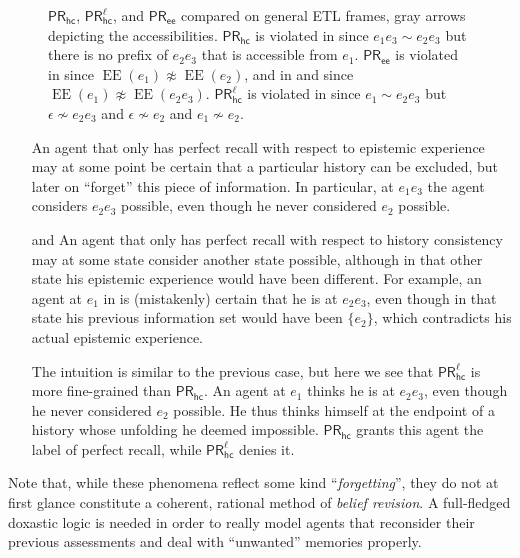\documentclass{article}
\newcommand{\PRhc}{\ensuremath{\mathsf{PR_{hc}}}\xspace}
\newcommand{\PRhcl}{\ensuremath{\mathsf{PR_{hc}^\ell}}\xspace}
\newcommand{\PRee}{\ensuremath{\mathsf{PR_{ee}}}\xspace}
\newcommand{\acc}{\sim}
\DeclareMathOperator{\EE}{EE}
\newcounter{#1}
\begin{document}
\begin{figure}
{
}
  \caption{\PRhc, \PRhcl, and \PRee compared on general ETL frames,
    gray arrows depicting the accessibilities.
    \PRhc is violated in 
    since $e_1e_3\acc e_2e_3$ but there is no prefix of $e_2e_3$ that is accessible from $e_1$.
    \PRee is violated in 
    since $\EE(e_1)\not\approx\EE(e_2)$,
    and in  and 
    since $\EE(e_1)\not\approx\EE(e_2e_3)$.
    \PRhcl is violated in 
    since $e_1\acc e_2e_3$ but $\epsilon\not\acc e_2e_3$ and $\epsilon\not\acc e_2$ and $e_1\not\acc e_2$.
}
  \label{fig:pr-ee-pr-hc}
\end{figure}

\begin{itemize}
  \item[\subref{fig:pr-ee-pr-hc:ee-not-hc}]
    An agent that only has perfect recall with respect to epistemic experience
    may at some point be certain that a particular history can be excluded,
    but later on ``forget'' this piece of information.
    In particular, at $e_1e_3$ the agent considers $e_2e_3$ possible,
    even though he never considered $e_2$ possible.
  \item[\subref{fig:pr-ee-pr-hc:hc-not-ee-1} and \subref{fig:pr-ee-pr-hc:hc-not-ee-2}]
    An agent that only has perfect recall with respect to history consistency
    may at some state consider another state possible,
    although in that other state his epistemic experience would have been different.
    For example, an agent at $e_1$ in 
    is (mistakenly) certain that he is at $e_2e_3$,
    even though in that state his previous information set would have been $\{e_2\}$,
    which contradicts his actual epistemic experience.
  \item[\subref{fig:pr-ee-pr-hc:hc-not-hcl}]
    The intuition is similar to the previous case,
    but here we see that \PRhcl is more fine-grained than \PRhc.
    An agent at $e_1$ thinks he is at $e_2e_3$,
    even though he never considered $e_2$ possible.
    He thus thinks himself at the endpoint of a history whose unfolding he deemed impossible.
    \PRhc grants this agent the label of perfect recall,
    while \PRhcl denies it.
\end{itemize}

Note that, while these phenomena reflect some kind ``\emph{forgetting}'',
they do not at first glance constitute a coherent, rational method of \emph{belief revision}.
A full-fledged doxastic logic is needed in order to really model agents
that reconsider their previous assessments and deal with ``unwanted'' memories properly.
\end{document}
